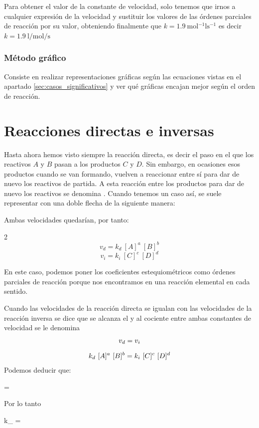 Para obtener el valor de la constante de velocidad, solo tenemos que irnos a cualquier expresión de la velocidad y sustituir los valores de las órdenes parciales de reacción por su valor, obteniendo finalmente que $k = 1.9\ \si{\mole^{-1}\litre\s^{-1}}$ es decir $k = \SI{1.9}{\litre\per\mole\per\s}$

\subsubsection{Método gráfico}
Consiste en realizar representaciones gráficas según las ecuaciones vistas en el apartado \ref{sec:casos_significativos} y ver qué gráficas encajan mejor según el orden de reacción.


\section{Reacciones directas e inversas}

Hasta ahora hemos visto siempre la reacción directa, es decir el paso en el que los reactivos $A$ y $B$ pasan a los productos $C$ y $D$.
Sin embargo, en ocasiones esos productos cuando se van formando, vuelven a reaccionar entre sí para dar de nuevo los reactivos de partida.
A esta reacción entre los productos para dar de nuevo los reactivos se denomina .
Cuando tenemos un caso así, se suele representar con una doble flecha de la siguiente manera:
\begin{centeredequation}
     \label{eq:general_equilibrio}
\end{centeredequation}

Ambas velocidades quedarían, por tanto:
\begin{paracol}{2}
    \begin{equation*}
        v_d = k_d\ [A]^a\ [B]^b
    \end{equation*}
    \switchcolumn
    \begin{equation*}
        v_i = k_i\ [C]^c\ [D]^d
    \end{equation*}
\end{paracol}
En este caso, podemos poner los coeficientes estequiométricos como órdenes parciales de reacción porque nos encontramos en una reacción elemental en cada sentido.

Cuando las velocidades de la reacción directa se igualan con las velocidades de la reacción inversa se dice que se alcanza el  y al cociente entre ambas constantes de velocidad se le denomina 
\begin{gather*}
    v_d = v_i\separ
    k_d\ [A]^a\ [B]^b = k_i\ [C]^c\ [D]^d
\end{gather*}
Podemos deducir que:
\begin{centeredequation}
     = 
\end{centeredequation}
Por lo tanto
\begin{centeredequation}
    k_{} = 
\end{centeredequation}

